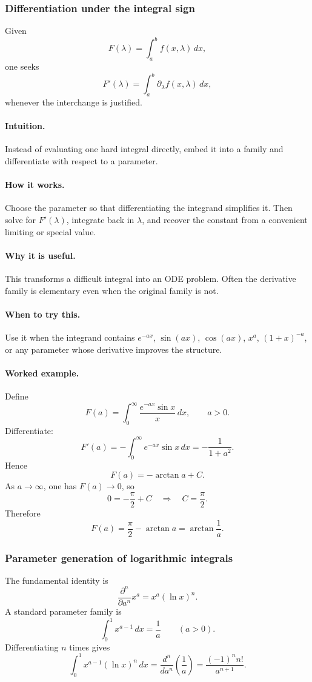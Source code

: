 \documentclass[12pt]{article}
\begin{document}
\subsubsection{Differentiation under the integral sign}
Given
\[
F(\lambda)=\int_a^b f(x,\lambda)\,dx,
\]
one seeks
\[
F'(\lambda)=\int_a^b \partial_\lambda f(x,\lambda)\,dx,
\]
whenever the interchange is justified.

\paragraph{Intuition.}
Instead of evaluating one hard integral directly, embed it into a family and differentiate with respect to a parameter.

\paragraph{How it works.}
Choose the parameter so that differentiating the integrand simplifies it. Then solve for \(F'(\lambda)\), integrate back in \(\lambda\), and recover the constant from a convenient limiting or special value.

\paragraph{Why it is useful.}
This transforms a difficult integral into an ODE problem. Often the derivative family is elementary even when the original family is not.

\paragraph{When to try this.}
Use it when the integrand contains \(e^{-ax}\), \(\sin(ax)\), \(\cos(ax)\), \(x^a\), \((1+x)^{-a}\), or any parameter whose derivative improves the structure.

\paragraph{Worked example.}
Define
\[
F(a)=\int_0^\infty \frac{e^{-ax}\sin x}{x}\,dx,
\qquad a>0.
\]
Differentiate:
\[
F'(a)=-\int_0^\infty e^{-ax}\sin x\,dx=-\frac{1}{1+a^2}.
\]
Hence
\[
F(a)=-\arctan a+C.
\]
As \(a\to\infty\), one has \(F(a)\to 0\), so
\[
0=-\frac{\pi}{2}+C
\quad\Rightarrow\quad
C=\frac{\pi}{2}.
\]
Therefore
\[
F(a)=\frac{\pi}{2}-\arctan a=\arctan\!\frac1a.
\]

\newpage
\subsubsection{Parameter generation of logarithmic integrals}
The fundamental identity is
\[
\frac{\partial^n}{\partial a^n}x^a=x^a(\ln x)^n.
\]
A standard parameter family is
\[
\int_0^1 x^{a-1}\,dx=\frac1a
\qquad (a>0).
\]
Differentiating \(n\) times gives
\[
\int_0^1 x^{a-1}(\ln x)^n\,dx
=\frac{d^n}{da^n}\!\left(\frac1a\right)
=\frac{(-1)^n n!}{a^{n+1}}.
\]
\end{document}
